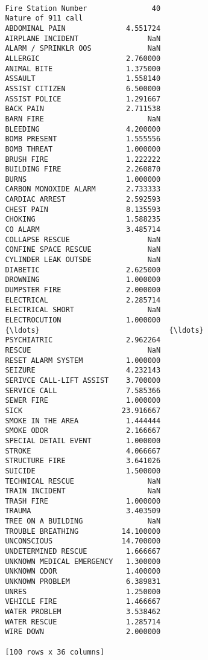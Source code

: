 \documentclass[11pt]{article}
\begin{document}
\begin{Verbatim}[commandchars=\\\{\}]
                                               
         Fire Station Number               40  
         Nature of 911 call                    
         ABDOMINAL PAIN              4.551724  
         AIRPLANE INCIDENT                NaN  
         ALARM / SPRINKLR OOS             NaN  
         ALLERGIC                    2.760000  
         ANIMAL BITE                 1.375000  
         ASSAULT                     1.558140  
         ASSIST CITIZEN              6.500000  
         ASSIST POLICE               1.291667  
         BACK PAIN                   2.711538  
         BARN FIRE                        NaN  
         BLEEDING                    4.200000  
         BOMB PRESENT                1.555556  
         BOMB THREAT                 1.000000  
         BRUSH FIRE                  1.222222  
         BUILDING FIRE               2.260870  
         BURNS                       1.000000  
         CARBON MONOXIDE ALARM       2.733333  
         CARDIAC ARREST              2.592593  
         CHEST PAIN                  8.135593  
         CHOKING                     1.588235  
         CO ALARM                    3.485714  
         COLLAPSE RESCUE                  NaN  
         CONFINE SPACE RESCUE             NaN  
         CYLINDER LEAK OUTSDE             NaN  
         DIABETIC                    2.625000  
         DROWNING                    1.000000  
         DUMPSTER FIRE               2.000000  
         ELECTRICAL                  2.285714  
         ELECTRICAL SHORT                 NaN  
         ELECTROCUTION               1.000000  
         {\ldots}                              {\ldots}  
         PSYCHIATRIC                 2.962264  
         RESCUE                           NaN  
         RESET ALARM SYSTEM          1.000000  
         SEIZURE                     4.232143  
         SERIVCE CALL-LIFT ASSIST    3.700000  
         SERVICE CALL                7.585366  
         SEWER FIRE                  1.000000  
         SICK                       23.916667  
         SMOKE IN THE AREA           1.444444  
         SMOKE ODOR                  2.166667  
         SPECIAL DETAIL EVENT        1.000000  
         STROKE                      4.066667  
         STRUCTURE FIRE              3.641026  
         SUICIDE                     1.500000  
         TECHNICAL RESCUE                 NaN  
         TRAIN INCIDENT                   NaN  
         TRASH FIRE                  1.000000  
         TRAUMA                      3.403509  
         TREE ON A BUILDING               NaN  
         TROUBLE BREATHING          14.100000  
         UNCONSCIOUS                14.700000  
         UNDETERMINED RESCUE         1.666667  
         UNKNOWN MEDICAL EMERGENCY   1.300000  
         UNKNOWN ODOR                1.400000  
         UNKNOWN PROBLEM             6.389831  
         UNRES                       1.250000  
         VEHICLE FIRE                1.466667  
         WATER PROBLEM               3.538462  
         WATER RESCUE                1.285714  
         WIRE DOWN                   2.000000  
         
         [100 rows x 36 columns]
\end{Verbatim}
            
\end{document}
